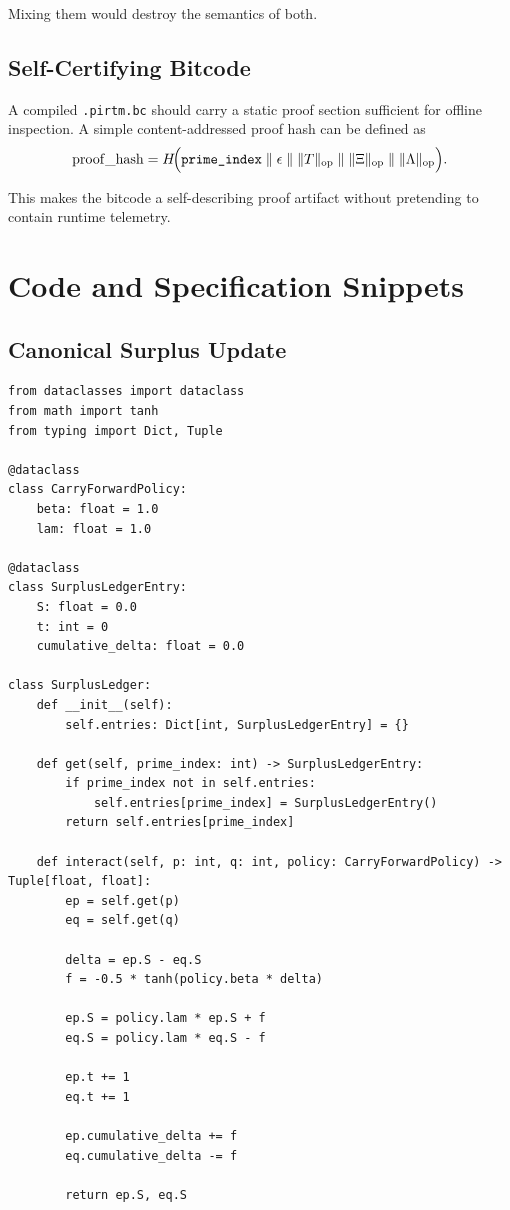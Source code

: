 \documentclass[11pt]{article}
\begin{document}
Mixing them would destroy the semantics of both.

\subsection{Self-Certifying Bitcode}

A compiled \texttt{.pirtm.bc} should carry a static proof section sufficient for offline inspection. A simple content-addressed proof hash can be defined as
\[
\mathrm{proof\_hash}
=
H\!\Bigl(
\texttt{prime\_index}
\;\Vert\;
\epsilon
\;\Vert\;
\|T\|_{\mathrm{op}}
\;\Vert\;
\|\Xi\|_{\mathrm{op}}
\;\Vert\;
\|\Lambda\|_{\mathrm{op}}
\Bigr).
\]

This makes the bitcode a self-describing proof artifact without pretending to contain runtime telemetry.

\section{Code and Specification Snippets}

\subsection{Canonical Surplus Update}

\begin{lstlisting}[style=python,caption={Reference Python sketch for the canonical surplus kernel}]
from dataclasses import dataclass
from math import tanh
from typing import Dict, Tuple

@dataclass
class CarryForwardPolicy:
    beta: float = 1.0
    lam: float = 1.0

@dataclass
class SurplusLedgerEntry:
    S: float = 0.0
    t: int = 0
    cumulative_delta: float = 0.0

class SurplusLedger:
    def __init__(self):
        self.entries: Dict[int, SurplusLedgerEntry] = {}

    def get(self, prime_index: int) -> SurplusLedgerEntry:
        if prime_index not in self.entries:
            self.entries[prime_index] = SurplusLedgerEntry()
        return self.entries[prime_index]

    def interact(self, p: int, q: int, policy: CarryForwardPolicy) -> Tuple[float, float]:
        ep = self.get(p)
        eq = self.get(q)

        delta = ep.S - eq.S
        f = -0.5 * tanh(policy.beta * delta)

        ep.S = policy.lam * ep.S + f
        eq.S = policy.lam * eq.S - f

        ep.t += 1
        eq.t += 1

        ep.cumulative_delta += f
        eq.cumulative_delta -= f

        return ep.S, eq.S
\end{lstlisting}
\end{document}
